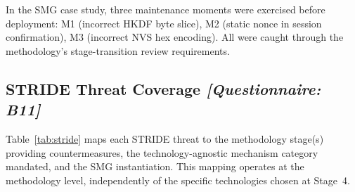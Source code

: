 \documentclass[12pt,a4paper]{article}
\newcommand{\qtag}[1]{\hfill\textcolor{gray!70}{\small\textit{[Questionnaire: #1]}}}
\begin{document}
In the SMG case study, three maintenance moments were exercised before deployment: M1 (incorrect HKDF byte slice), M2 (static nonce in session confirmation), M3 (incorrect NVS hex encoding). All were caught through the methodology's stage-transition review requirements.

\subsection{STRIDE Threat Coverage \qtag{B11}}
\label{sec:stride}

Table~\ref{tab:stride} maps each STRIDE threat to the methodology stage(s) providing countermeasures, the technology-agnostic mechanism category mandated, and the SMG instantiation. This mapping operates at the methodology level, independently of the specific technologies chosen at Stage~4.
\end{document}
